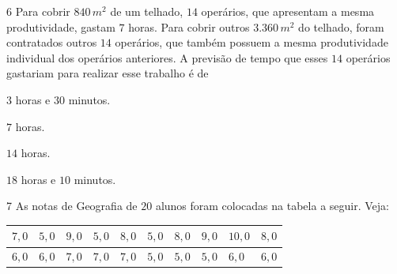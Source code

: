 \num{6}  Para cobrir $840\,m^2$ de um telhado, $14$ operários, que apresentam a
mesma produtividade, gastam $7$ horas. Para cobrir outros $3.360\,m^2$ do
telhado, foram contratados outros $14$ operários, que também possuem a
mesma produtividade individual dos operários anteriores. A previsão de
tempo que esses $14$ operários gastariam para realizar esse trabalho é de

\begin{multicols}{2}
\begin{escolha}
\item $3$ horas e $30$ minutos.
\item $7$ horas.
\item $14$ horas.
\item $18$ horas e $10$ minutos.
\end{escolha}
\end{multicols}




\num{7}  As notas de Geografia de $20$ alunos foram colocadas na tabela a seguir. Veja:

\begin{longtable}[]{@{}llllllllll@{}}
\toprule
$7,0$ & $5,0$ & $9,0$ & $5,0$ & $8,0$ & $5,0$ & $8,0$ & $9,0$ & $10,0$ &
$8,0$\tabularnewline
\midrule
\endhead
$6,0$ & $6,0$ & $7,0$ & $7,0$ & $7,0$ & $5,0$ & $5,0$ & $5,0$ & $6,0$ & $6,0$\tabularnewline
\bottomrule
\end{longtable}

